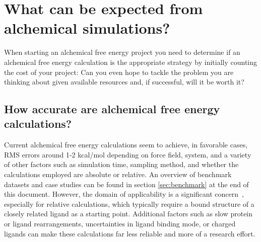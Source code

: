 \documentclass[9pt,bestpractices]{livecoms}
\begin{document}
\section{What can be expected from alchemical simulations?}
\label{sec:step0}


When starting an alchemical free energy project you need to determine if an alchemical free energy calculation is the appropriate strategy by initially counting the cost of your
project: Can you even hope to tackle the problem you are thinking
about given available resources and, if successful, will it
be worth it?
\subsection*{How accurate are alchemical free energy calculations?}

Current alchemical free energy calculations seem to achieve, in favorable cases, RMS errors around 1-2 kcal/mol depending on force field, system, and a variety of other factors such as simulation time, sampling method, and whether the calculations employed are absolute or relative. An overview of benchmark datasets and case studies can be found in section \ref{sec:benchmark} at the end of this document.
However, the domain of applicability is a significant concern~\cite{sherborne2016collaborating, cournia2017relative}, especially for relative calculations, which typically require a bound structure of a closely
related ligand as a starting point. Additional factors such as slow protein or ligand rearrangements, uncertainties in ligand binding mode, or charged ligands can make these calculations far less reliable and more of a research effort.
\end{document}
